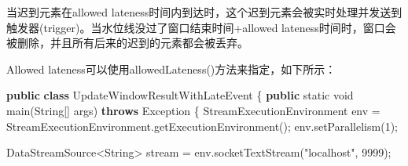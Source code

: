 \documentclass[cn,11pt,chinese]{elegantbook}
\newenvironment{Shaded}{}{}
\newcommand{\BuiltInTok}[1]{#1}
\newcommand{\DataTypeTok}[1]{\textcolor[rgb]{0.56,0.13,0.00}{#1}}
\newcommand{\DecValTok}[1]{\textcolor[rgb]{0.25,0.63,0.44}{#1}}
\newcommand{\FunctionTok}[1]{\textcolor[rgb]{0.02,0.16,0.49}{#1}}
\newcommand{\KeywordTok}[1]{\textcolor[rgb]{0.00,0.44,0.13}{\textbf{#1}}}
\newcommand{\NormalTok}[1]{#1}
\newcommand{\StringTok}[1]{\textcolor[rgb]{0.25,0.44,0.63}{#1}}
\begin{document}
当迟到元素在allowed
lateness时间内到达时，这个迟到元素会被实时处理并发送到触发器(trigger)。当水位线没过了窗口结束时间+allowed
lateness时间时，窗口会被删除，并且所有后来的迟到的元素都会被丢弃。

Allowed lateness可以使用allowedLateness()方法来指定，如下所示：

\begin{Shaded}
\begin{Highlighting}[]
\KeywordTok{public} \KeywordTok{class}\NormalTok{ UpdateWindowResultWithLateEvent \{}
    \KeywordTok{public} \DataTypeTok{static} \DataTypeTok{void} \FunctionTok{main}\NormalTok{(}\BuiltInTok{String}\NormalTok{[] args) }\KeywordTok{throws} \BuiltInTok{Exception}\NormalTok{ \{}
\NormalTok{        StreamExecutionEnvironment env = StreamExecutionEnvironment.}\FunctionTok{getExecutionEnvironment}\NormalTok{();}
\NormalTok{        env.}\FunctionTok{setParallelism}\NormalTok{(}\DecValTok{1}\NormalTok{);}

\NormalTok{        DataStreamSource\textless{}}\BuiltInTok{String}\NormalTok{\textgreater{} stream = env.}\FunctionTok{socketTextStream}\NormalTok{(}\StringTok{"localhost"}\NormalTok{, }\DecValTok{9999}\NormalTok{);}


\end{Highlighting}
\end{Shaded}
\end{document}
